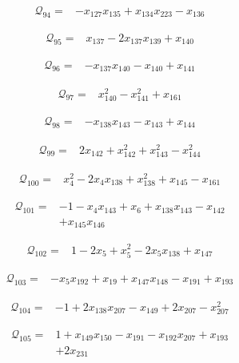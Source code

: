 \begin{align*}
\mathcal{Q}_{94}={}&-x_{127}x_{135}+x_{134}x_{223}-x_{136}
\end{align*}

\begin{align*}
\mathcal{Q}_{95}={}&x_{137}-2x_{137}x_{139}+x_{140}
\end{align*}

\begin{align*}
\mathcal{Q}_{96}={}&-x_{137}x_{140}-x_{140}+x_{141}
\end{align*}

\begin{align*}
\mathcal{Q}_{97}={}&x_{140}^{2}-x_{141}^{2}+x_{161}
\end{align*}

\begin{align*}
\mathcal{Q}_{98}={}&-x_{138}x_{143}-x_{143}+x_{144}
\end{align*}

\begin{align*}
\mathcal{Q}_{99}={}&2x_{142}+x_{142}^{2}+x_{143}^{2}-x_{144}^{2}
\end{align*}

\begin{align*}
\mathcal{Q}_{100}={}&x_{4}^{2}-2x_{4}x_{138}+x_{138}^{2}+x_{145}-x_{161}
\end{align*}

\begin{align*}
\mathcal{Q}_{101}={}&-1-x_{4}x_{143}+x_{6}+x_{138}x_{143}-x_{142}\\
&+x_{145}x_{146}
\end{align*}

\begin{align*}
\mathcal{Q}_{102}={}&1-2x_{5}+x_{5}^{2}-2x_{5}x_{138}+x_{147}
\end{align*}

\begin{align*}
\mathcal{Q}_{103}={}&-x_{5}x_{192}+x_{19}+x_{147}x_{148}-x_{191}+x_{193}
\end{align*}

\begin{align*}
\mathcal{Q}_{104}={}&-1+2x_{138}x_{207}-x_{149}+2x_{207}-x_{207}^{2}
\end{align*}

\begin{align*}
\mathcal{Q}_{105}={}&1+x_{149}x_{150}-x_{191}-x_{192}x_{207}+x_{193}\\
&+2x_{231}
\end{align*}

